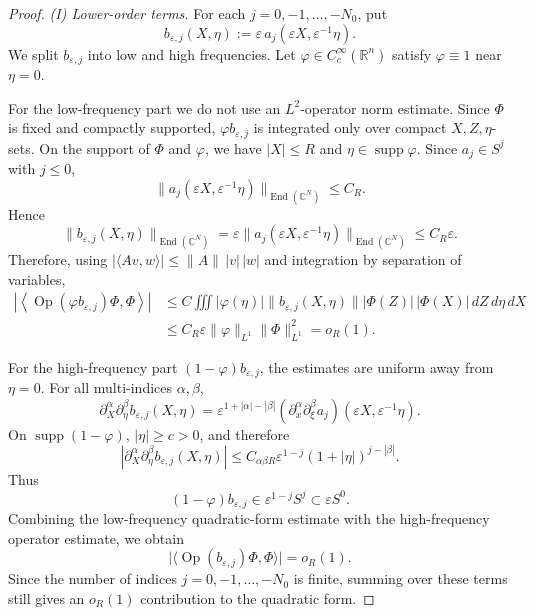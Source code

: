 \documentclass[a4paper, 12pt]{article}
\begin{document}
\begin{proof}
	\smallskip
	\noindent\emph{(I) Lower-order terms.}
	For each \(j=0,-1,\ldots,-N_0\), put
	\[
	b_{\varepsilon,j}(X,\eta)
	:=
	\varepsilon\,a_j(\varepsilon X,\varepsilon^{-1}\eta).
	\]
	We split \(b_{\varepsilon,j}\) into low and high frequencies. Let
	\(\varphi\in C_c^\infty(\mathbb R^n)\) satisfy \(\varphi\equiv1\) near
	\(\eta=0\).
	
	For the low-frequency part we do not use an \(L^2\)-operator norm estimate.
	Since \(\Phi\) is fixed and compactly supported, \(\varphi b_{\varepsilon,j}\)
	is integrated only over compact \(X,Z,\eta\)-sets. On the support of \(\Phi\) and \(\varphi\), we have \(|X|\le R\) and
	\(\eta\in \operatorname{supp}\varphi\). Since \(a_j\in S^j\) with \(j\le0\),
	\[
	\|a_j(\varepsilon X,\varepsilon^{-1}\eta)\|_{\operatorname{End}(\mathbb C^N)}
	\le C_R.
	\]
	Hence
	\[
	\|b_{\varepsilon,j}(X,\eta)\|_{\operatorname{End}(\mathbb C^N)}
	=
	\varepsilon
	\|a_j(\varepsilon X,\varepsilon^{-1}\eta)\|_{\operatorname{End}(\mathbb C^N)}
	\le C_R\varepsilon.
	\]
	Therefore, using \(|\langle Av,w\rangle|\le \|A\|\,|v|\,|w|\) and integration by separation of variables,
	\[
	\begin{aligned}
		\left|
		\left\langle
		\operatorname{Op}(\varphi b_{\varepsilon,j})\Phi,\Phi
		\right\rangle
		\right|
		&\le
		C
		\iiint
		|\varphi(\eta)|
		\|b_{\varepsilon,j}(X,\eta)\|
		|\Phi(Z)|\,|\Phi(X)|
		\,dZ\,d\eta\,dX  \\
		&\le
		C_R\varepsilon
		\|\varphi\|_{L^1}
		\|\Phi\|_{L^1}^2
		=o_R(1).
	\end{aligned}
	\]
	
	For the high-frequency part \((1-\varphi)b_{\varepsilon,j}\), the estimates are
	uniform away from \(\eta=0\). For all multi-indices \(\alpha,\beta\),
	\[
	\partial_X^\alpha\partial_\eta^\beta b_{\varepsilon,j}(X,\eta)
	=
	\varepsilon^{1+|\alpha|-|\beta|}
	(\partial_x^\alpha\partial_\xi^\beta a_j)(\varepsilon X,\varepsilon^{-1}\eta).
	\]
	On \(\operatorname{supp}(1-\varphi)\), \(|\eta|\ge c>0\), and therefore
	\[
	|\partial_X^\alpha\partial_\eta^\beta b_{\varepsilon,j}(X,\eta)|
	\le
	C_{\alpha\beta R}\varepsilon^{1-j}(1+|\eta|)^{j-|\beta|}.
	\]
	Thus
	\[
	(1-\varphi)b_{\varepsilon,j}\in \varepsilon^{1-j}S^j
	\subset \varepsilon S^0 .
	\]
	Combining the low-frequency quadratic-form estimate with the high-frequency
	operator estimate, we obtain
	\[
	\bigl|\langle\operatorname{Op}(b_{\varepsilon,j})\Phi,\Phi\rangle\bigr|
	=o_R(1).
	\]
	Since the number of indices \(j=0,-1,\ldots,-N_0\) is finite, summing over
	these terms still gives an \(o_R(1)\) contribution to the quadratic form.	
	

\end{proof}
\end{document}
